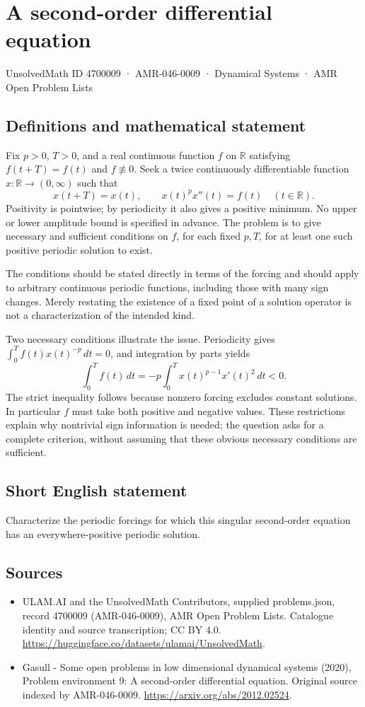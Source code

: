 \documentclass[11pt,a4paper]{article}
\begin{document}
\section*{A second-order differential equation}\label{4700009}
{\small UnsolvedMath ID 4700009 · AMR-046-0009 · Dynamical Systems · AMR Open Problem Lists}
\subsection{Definitions and mathematical statement}
Fix $p>0$, $T>0$, and a real continuous function $f$ on $\mathbb R$ satisfying
$f(t+T)=f(t)$ and $f\not\equiv0$. Seek a twice continuously differentiable
function $x:\mathbb R\to(0,\infty)$ such that
\[
 x(t+T)=x(t),\qquad x(t)^p x''(t)=f(t)
 \quad(t\in\mathbb R).
\]
Positivity is pointwise; by periodicity it also gives a positive minimum.
No upper or lower amplitude bound is specified in advance. The problem is
to give necessary and sufficient conditions on $f$, for each fixed $p,T$,
for at least one such positive periodic solution to exist.

The conditions should be stated directly in terms of the forcing and should
apply to arbitrary continuous periodic functions, including those with many
sign changes. Merely restating the existence of a fixed point of a solution
operator is not a characterization of the intended kind.

Two necessary conditions illustrate the issue. Periodicity gives $\int_0^T f(t)x(t)^{-p}\,dt=0$, and integration by parts yields
\[
 \int_0^T f(t)\,dt=-p\int_0^T x(t)^{p-1}x'(t)^2\,dt<0.
\]
The strict inequality follows because nonzero forcing excludes constant
solutions. In particular $f$ must take both positive and negative values.
These restrictions explain why nontrivial sign information is needed; the
question asks for a complete criterion, without assuming that these obvious
necessary conditions are sufficient.
\subsection{Short English statement}
Characterize the periodic forcings for which this singular second-order equation has an everywhere-positive periodic solution.
\subsection{Sources}
\begin{itemize}
\item[S1] ULAM.AI and the UnsolvedMath Contributors, supplied problems.json, record 4700009 (AMR-046-0009), AMR Open Problem Lists. Catalogue identity and source transcription; CC BY 4.0.
\url{https://huggingface.co/datasets/ulamai/UnsolvedMath}.
\item[S2] Gasull - Some open problems in low dimensional dynamical systems (2020), Problem environment 9: A second-order differential equation. Original source indexed by AMR-046-0009.
\url{https://arxiv.org/abs/2012.02524}.
\end{itemize}
\end{document}
